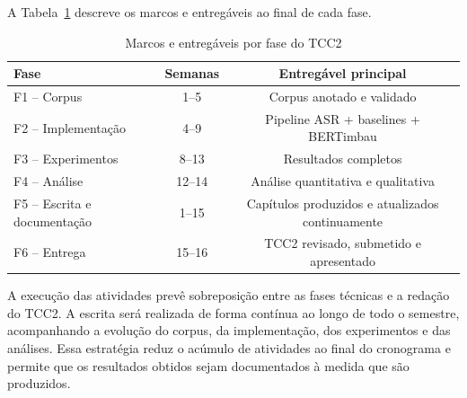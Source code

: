 \documentclass[
    12pt,                %
    openright,           %
    oneside,             %
    a4paper,             %
    english,             %
    brazil               %
]{abntex2}
\begin{document}
A Tabela~\ref{tab:cronograma} descreve os marcos e entregáveis ao final de cada fase.

\begin{table}[htb]
    \centering
    \caption{Marcos e entregáveis por fase do TCC2}
    \label{tab:cronograma}
    \begin{tabular}{lcc}
        \toprule
        \textbf{Fase}
            & \textbf{Semanas}
            & \textbf{Entregável principal} \\
        \midrule
        F1 -- Corpus
            & 1--5
            & Corpus anotado e validado \\
        F2 -- Implementação
            & 4--9
            & Pipeline ASR + baselines + BERTimbau \\
        F3 -- Experimentos
            & 8--13
            & Resultados completos \\
        F4 -- Análise
            & 12--14
            & Análise quantitativa e qualitativa \\
        F5 -- Escrita e documentação
            & 1--15
            & Capítulos produzidos e atualizados continuamente \\
        F6 -- Entrega
            & 15--16
            & TCC2 revisado, submetido e apresentado \\
        \bottomrule
    \end{tabular}
\end{table}

A execução das atividades prevê sobreposição entre as fases técnicas e a redação do TCC2. A escrita será realizada de forma contínua ao longo de todo o semestre, acompanhando a evolução do corpus, da implementação, dos experimentos e das análises. Essa estratégia reduz o acúmulo de atividades ao final do cronograma e permite que os resultados obtidos sejam documentados à medida que são produzidos.

\postextual



%
%
%
\end{document}
